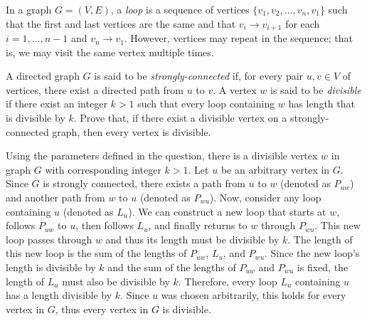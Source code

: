 \documentclass{article}
\begin{document}
\begin{question}
In a graph $G = (V, E)$, a {\em loop} is a sequence of vertices $\{v_1, v_2, \dots, v_n, v_1\}$ such that the first and last vertices are the same and that $v_i \to v_{i + 1}$ for each $i = 1, \dots, n - 1$ and $v_n \to v_1$. However, vertices may repeat in the sequence; that is, we may visit the same vertex multiple times.

A directed graph $G$ is said to be {\em strongly-connected} if, for every pair $u, v \in V$ of vertices, there exist a directed path from $u$ to $v$. A vertex $w$ is said to be {\em divisible} if there exist an integer $k > 1$ such that every loop containing $w$ has length that is divisible by $k$. Prove that, if there exist a divisible vertex on a strongly-connected graph, then every vertex is divisible.
\end{question}

\begin{solution}
Using the parameters defined in the question, there is a divisible vertex $w$ in graph $G$ with corresponding integer $k > 1$. Let $u$ be an arbitrary vertex in $G$. Since $G$ is strongly connected, there exists a path from $u$ to $w$ (denoted as $P_{uw}$) and another path from $w$ to $u$ (denoted as $P_{wu}$). Now, consider any loop containing $u$ (denoted as $L_u$). We can construct a new loop that starts at $w$, follows $P_{uw}$ to $u$, then follows $L_u$, and finally returns to $w$ through $P_{wu}$. This new loop passes through $w$ and thus its length must be divisible by $k$. The length of this new loop is the sum of the lengths of $P_{uw}$, $L_u$, and $P_{wu}$. Since the new loop's length is divisible by $k$ and the sum of the lengths of $P_{uw}$ and $P_{wu}$ is fixed, the length of $L_u$ must also be divisible by $k$. Therefore, every loop $L_u$ containing $u$ has a length divisible by $k$. Since $u$ was chosen arbitrarily, this holds for every vertex in $G$, thus every vertex in $G$ is divisible.
\end{solution}
\end{document}

